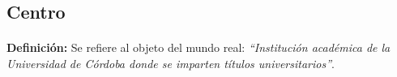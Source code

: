 \subsection{Centro}

  \paragraph{}\textbf{Definición:} Se refiere al objeto del mundo real:
  \emph{``Institución académica de la Universidad de Córdoba donde se imparten
  títulos universitarios''}.




